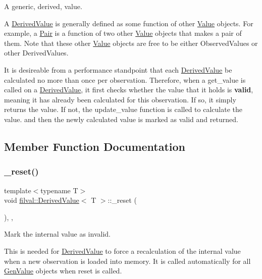 A generic, derived, value. 

A \hyperlink{classfilval_1_1DerivedValue}{Derived\+Value} is generally defined as some function of other \hyperlink{classfilval_1_1Value}{Value} objects. For example, a \hyperlink{classfilval_1_1Pair}{Pair} is a function of two other \hyperlink{classfilval_1_1Value}{Value} objects that makes a pair of them. Note that these other \hyperlink{classfilval_1_1Value}{Value} objects are free to be either Observed\+Values or other Derived\+Values.

It is desireable from a performance standpoint that each \hyperlink{classfilval_1_1DerivedValue}{Derived\+Value} be calculated no more than once per observation. Therefore, when a get\+\_\+value is called on a \hyperlink{classfilval_1_1DerivedValue}{Derived\+Value}, it first checks whether the value that it holds is {\bfseries valid}, meaning it has already been calculated for this observation. If so, it simply returns the value. If not, the update\+\_\+value function is called to calculate the value. and then the newly calculated value is marked as valid and returned. 

\subsection{Member Function Documentation}
\hypertarget{classfilval_1_1DerivedValue_a07fef8f98ae4b47e2c4d0f467aa0d6e3}{}\label{classfilval_1_1DerivedValue_a07fef8f98ae4b47e2c4d0f467aa0d6e3} 
\subsubsection{\texorpdfstring{\+\_\+reset()}{\_reset()}}
{\footnotesize\ttfamily template$<$typename T$>$ \\
void \hyperlink{classfilval_1_1DerivedValue}{filval\+::\+Derived\+Value}$<$ T $>$\+::\+\_\+reset (\begin{DoxyParamCaption}{ }\end{DoxyParamCaption})\hspace{0.3cm}{\ttfamily [inline]}, {\ttfamily [private]}, {\ttfamily [virtual]}}



Mark the internal value as invalid. 

This is needed for \hyperlink{classfilval_1_1DerivedValue}{Derived\+Value} to force a recalculation of the internal value when a new observation is loaded into memory. It is called automatically for all \hyperlink{classfilval_1_1GenValue}{Gen\+Value} objects when reset is called. 

